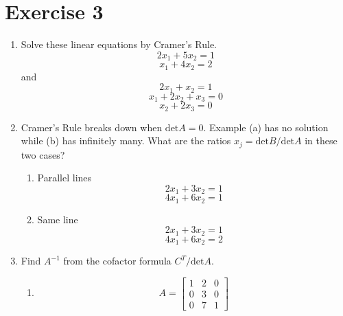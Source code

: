 \section{Exercise 3}
\begin{enumerate}
    \item Solve these linear equations by Cramer's Rule.
    \begin{equation}
        2x_{1} + 5x_{2} = 1
    \end{equation}
    \begin{equation}
        x_{1} + 4x_{2} = 2
    \end{equation}
    and 
    \begin{equation}
        2x_{1} +x_{2} =1
    \end{equation}
    \begin{equation}
        x_{1} + 2x_{2} + x_{3} = 0
    \end{equation}
    \begin{equation}
        x_{2} + 2x_{3} = 0
    \end{equation}

    \item Cramer's Rule breaks down when $\text{det}A=0$. Example (a) has
        no solution while (b) has infinitely many. What are the ratios
        $x_{j} = \text{det}B/\text{det}A$ in these two cases?
        \begin{enumerate}[label=\alph*.]
            \item Parallel lines 
                \begin{equation}
                    2x_{1} + 3x_{2} = 1
                \end{equation}
                \begin{equation}
                    4x_{1} + 6x_{2} = 1
                \end{equation}
                
            \item Same line
                \begin{equation}
                    2x_{1} + 3x_{2} = 1
                \end{equation}
                \begin{equation}
                    4x_{1} + 6x_{2} =2 
                \end{equation}
        \end{enumerate}

    \item Find $A^{-1}$ from the cofactor formula $C^{T}/\text{det}A$.
        \begin{enumerate}[label=\alph*.]
            \item 
                \begin{equation}
                    A =
                    \begin{bmatrix}
                        1 & 2 & 0 \\
                        0 & 3 & 0 \\
                        0 & 7 & 1
                    \end{bmatrix}
                \end{equation}


\end{enumerate}
\end{enumerate}
